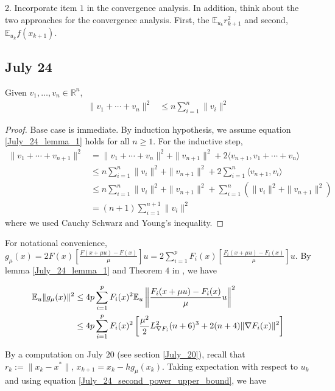 \documentclass{article}
\begin{document}
2. Incorporate item $1$ in the convergence analysis. In addition, think about the two approaches for the convergence analysis. First, the $\mathbb{E}_{u_k}r_{k+1}^2$ and second, $\mathbb{E}_{u_k}f(x_{k+1})$. \newline  

\subsection{July 24}

\begin{lemma}
Given $v_1, \dots, v_n \in \mathbb{R}^n$, 
\begin{align}
\|v_1 + \cdots + v_n\|^2 & \leq n\sum_{i=1}^n\|v_i\|^2 \label{July_24_lemma_1}
\end{align}
\begin{proof}
Base case is immediate. By induction hypothesis, we assume equation                                   \eqref{July_24_lemma_1} holds for all $n \geq 1$. For the inductive step,
\begin{align*}
\|v_1 + \cdots + v_{n+1}\|^2 & = \|v_1 + \cdots + v_n\|^2 + \|v_{n+1}\|^2 + 2\langle v_{n+1}, v_1 + \cdots + v_n\rangle \\ & \leq n\sum_{i=1}^n\|v_i\|^2 + \|v_{n+1}\|^2 + 2\sum_{i=1}^n\langle v_{n+1},v_i\rangle \\ & \leq n\sum_{i=1}^n\|v_i\|^2 + \|v_{n+1}\|^2 + \sum_{i=1}^n(\|v_i\|^2 + \|v_{n+1}\|^2) \\  & = (n+1)\sum_{i=1}^{n+1}\|v_i\|^2
\end{align*}
where we used Cauchy Schwarz and Young's inequality.
\end{proof}
\end{lemma}

For notational convenience, $g_{\mu}(x)= 2F(x)\left[\frac{F(x+\mu u) - F(x)}{\mu}\right]u = 2 \sum_{i=1}^pF_i(x)\left[\frac{F_i(x+\mu u) - F_i(x)}{\mu}\right]u$. By lemma \ref{July_24_lemma_1} and Theorem $4$ in \cite{Nesterov2015}, we have

\begin{align}
\mathbb{E}_u\|g_{\mu}(x)\|^2 & \leq 4p\sum_{i=1}^p F_i(x)^2\mathbb{E}_u\left\| \frac{F_i(x+\mu u) - F_i(x)}{\mu}u \right\|^2 \notag \\ & \leq 4p\sum_{i=1}^pF_i(x)^2\left[\frac{\mu^2}{2}L_{\nabla F_i}^2(n+6)^3 + 2(n+4)\|\nabla F_i(x)\|^2\right] \label{July_24_second_power_upper_bound}
\end{align}

By a computation on July $20$ (see section \ref{July_20}), recall that $r_k := \|x_k-x^*\|$, $x_{k+1} = x_k - hg_{\mu}(x_k)$. Taking expectation with respect to $u_k$ and using equation \eqref{July_24_second_power_upper_bound}, we have 
\end{document}
